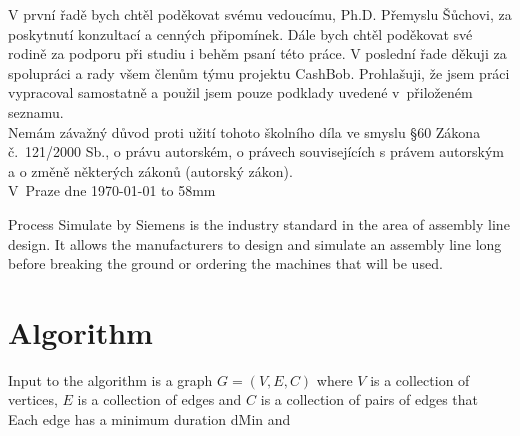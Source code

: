 \documentclass[11pt,twoside,a4paper]{book}
\author{Jan Dryk}
\begin{document}
%
\cleardoublepage

\maketitle
\cleardoublepage

{%
V první řadě bych chtěl poděkovat svému vedoucímu, Ph.D. Přemyslu Šůchovi, za poskytnutí konzultací a cenných připomínek.
Dále bych chtěl poděkovat své rodině za podporu při studiu i behěm psaní této práce.
V poslední řade děkuji za spolupráci a rady všem členům týmu projektu CashBob.
}
{%
Prohlašuji, že jsem práci vypracoval samostatně a použil jsem pouze podklady uvedené v~přiloženém seznamu.\\
Nemám závažný důvod proti užití tohoto školního díla ve smyslu \S 60 Zákona č.~121/2000 Sb., o právu autorském, o právech souvisejících s právem autorským a o změně některých zákonů (autorský zákon).
\\[15mm]
V~Praze dne \today \vspace{10mm} \hfill \hbox to 58mm{\tiny\dotfill}
}

\cleardoublepage


{

}
{
Process Simulate by Siemens is the industry standard in the area of assembly line design. It allows the manufacturers to design and simulate an assembly line long before breaking the ground or ordering the machines that will be used.
}

\setcounter{page}{1}

\tableofcontents




\section{Algorithm}
Input to the algorithm is a graph $G=(V, E, C)$ where $V$ is a collection of vertices, $E$ is a collection of edges and $C$ is a collection of pairs of edges that 
Each edge has a minimum duration dMin and 
\end{document}
